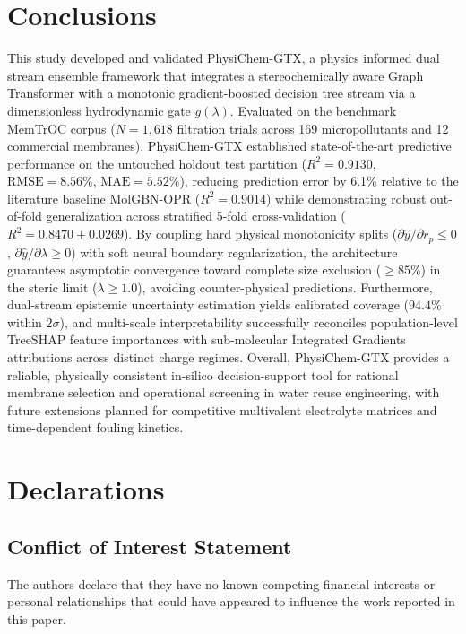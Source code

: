 \documentclass[11pt]{article}
\newcommand{\rsq}{R^{2}}
\begin{document}
\section{Conclusions}
\label{sec:conclusions}

This study developed and validated PhysiChem-GTX, a physics informed dual stream ensemble framework that integrates a stereochemically aware Graph Transformer with a monotonic gradient-boosted decision tree stream via a dimensionless hydrodynamic gate $g(\lambda)$. Evaluated on the benchmark MemTrOC corpus ($N = 1{,}618$ filtration trials across 169 micropollutants and 12 commercial membranes), PhysiChem-GTX established state-of-the-art predictive performance on the untouched holdout test partition ($\rsq = 0.9130$, $\mathrm{RMSE} = 8.56\%$, $\mathrm{MAE} = 5.52\%$), reducing prediction error by 6.1\% relative to the literature baseline MolGBN-OPR ($\rsq = 0.9014$) while demonstrating robust out-of-fold generalization across stratified 5-fold cross-validation ($\rsq = 0.8470 \pm 0.0269$). By coupling hard physical monotonicity splits ($\partial \hat{y}/\partial r_p \leq 0$, $\partial \hat{y}/\partial \lambda \geq 0$) with soft neural boundary regularization, the architecture guarantees asymptotic convergence toward complete size exclusion ($\ge 85\%$) in the steric limit ($\lambda \ge 1.0$), avoiding counter-physical predictions. Furthermore, dual-stream epistemic uncertainty estimation yields calibrated coverage ($94.4\%$ within $2\sigma$), and multi-scale interpretability successfully reconciles population-level TreeSHAP feature importances with sub-molecular Integrated Gradients attributions across distinct charge regimes. Overall, PhysiChem-GTX provides a reliable, physically consistent in-silico decision-support tool for rational membrane selection and operational screening in water reuse engineering, with future extensions planned for competitive multivalent electrolyte matrices and time-dependent fouling kinetics.

\section*{Declarations}

\subsection*{Conflict of Interest Statement}
The authors declare that they have no known competing financial interests or personal relationships that could have appeared to influence the work reported in this paper.
\end{document}
